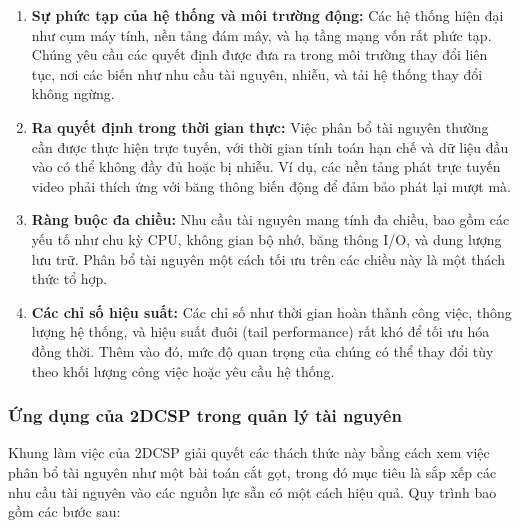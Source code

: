 \begin{enumerate}[1. ]
    \item \textbf{Sự phức tạp của hệ thống và môi trường động:}
    Các hệ thống hiện đại như cụm máy tính, nền tảng đám mây, và hạ tầng mạng vốn rất phức tạp. Chúng yêu cầu các quyết định được đưa ra trong môi trường thay đổi liên tục, nơi các biến như nhu cầu tài nguyên, nhiễu, và tải hệ thống thay đổi không ngừng.  

    \item \textbf{Ra quyết định trong thời gian thực:}
    Việc phân bổ tài nguyên thường cần được thực hiện trực tuyến, với thời gian tính toán hạn chế và dữ liệu đầu vào có thể không đầy đủ hoặc bị nhiễu. Ví dụ, các nền tảng phát trực tuyến video phải thích ứng với băng thông biến động để đảm bảo phát lại mượt mà.  

    \item \textbf{Ràng buộc đa chiều:}
    Nhu cầu tài nguyên mang tính đa chiều, bao gồm các yếu tố như chu kỳ CPU, không gian bộ nhớ, băng thông I/O, và dung lượng lưu trữ. Phân bổ tài nguyên một cách tối ưu trên các chiều này là một thách thức tổ hợp.  

    \item \textbf{Các chỉ số hiệu suất:}
    Các chỉ số như thời gian hoàn thành công việc, thông lượng hệ thống, và hiệu suất đuôi (tail performance) rất khó để tối ưu hóa đồng thời. Thêm vào đó, mức độ quan trọng của chúng có thể thay đổi tùy theo khối lượng công việc hoặc yêu cầu hệ thống.  
\end{enumerate}  

\subsubsection{Ứng dụng của 2DCSP trong quản lý tài nguyên}  
\hspace{0.5cm}Khung làm việc của 2DCSP giải quyết các thách thức này bằng cách xem việc phân bổ tài nguyên như một bài toán cắt gọt, trong đó mục tiêu là sắp xếp các nhu cầu tài nguyên vào các nguồn lực sẵn có một cách hiệu quả. Quy trình bao gồm các bước sau:  

